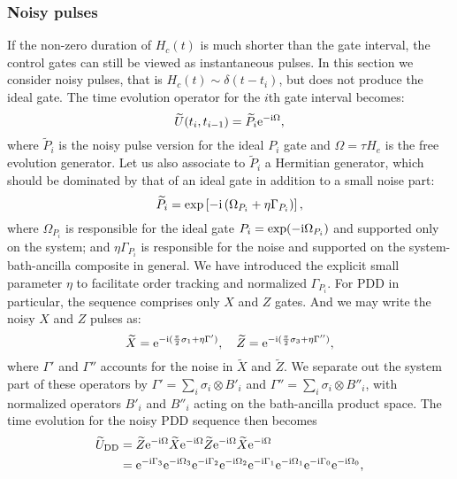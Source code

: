 \documentclass[pra,reprint,superscriptaddress]{revtex4-2}
\newcommand{\wtP}{\widetilde{P}}
\newcommand{\wtU}{\widetilde{U}}
\newcommand{\wt}[1]{\widetilde{#1}}
\newcommand{\rDD}{\mathrm{DD}}
\begin{document}
\subsubsection{Noisy pulses}
If the non-zero duration of $H_c(t)$ is much shorter than the gate interval,  the control gates can still be viewed as instantaneous pulses. In this section we consider noisy pulses, that is 
$H_c(t)\sim \delta(t-t_i)$, but does not produce the ideal gate.
The  time evolution operator for the $i$th gate interval becomes:
\begin{equation}\label{eq:npulses-Ui}
 \wtU(t_i,t_{i-1}) = \wtP_i \upe^{-\upi \Omega},
\end{equation}
where $\widetilde{P}_i$ is the noisy pulse version for the ideal $P_i$ gate and $\Omega=\tau H_e$ is the free evolution generator.
Let us also associate to $\wtP_i$ a Hermitian generator, which should be dominated by that of an ideal gate in addition to a small noise part:
\begin{equation}\label{eq:npulses-Pi}
 \widetilde{P}_i= \exp\left[ -\mathrm{i} \left( \Omega_{P_i} +  \eta \Gamma_{P_i} \right)  \right],
\end{equation}
where $\Omega_{P_i}$ is responsible for the ideal gate $P_i = \exp(-\mathrm{i} \Omega_{P_i})$ and supported only on the system; and $ \eta \Gamma_{P_i} $ is responsible for the noise and supported on the system-bath-ancilla composite in general. We have introduced the explicit small parameter $\eta$ to facilitate order tracking and normalized $\Gamma_{P_i}$. For PDD in particular, the sequence comprises only $X$ and $Z$ gates. 
And we may write the noisy $X$ and $Z$ pulses as:
\begin{equation}
\widetilde{X} = \mathrm{e}^{-\mathrm{i} ( \frac{\pi}{2} \sigma_1 + \eta\Gamma')},\quad
 \widetilde{Z} = \mathrm{e}^{-\mathrm{i} ( \frac{\pi}{2} \sigma_3 + \eta\Gamma'')},
\end{equation}
where $\Gamma'$ and $\Gamma''$ accounts for the noise in $\wt X$ and $\wt Z$.
We separate out the system part of these operators by $\Gamma' = \sum_i \sigma_i \otimes B'_i $ and $\Gamma''=\sum_i \sigma_i \otimes B''_i$, with normalized operators $B'_i$ and $B''_i$ acting on the bath-ancilla product space. 
The time evolution for the noisy PDD sequence then becomes
\begin{equation}\label{eq:UPDD-gatedep}
 \begin{aligned}
\wtU_\rDD &=
 \widetilde{Z} \upe^{-\upi \Omega}
 \widetilde{X} \upe^{-\upi \Omega}
 \widetilde{Z} \upe^{-\upi \Omega}
 \widetilde{X} \upe^{-\upi \Omega}\\
 & = \upe^{-\upi  \Gamma_3} \upe^{- \upi\Omega_3}
 \upe^{-\upi  \Gamma_2}  \upe^{-\upi\Omega_2}
\upe^{-\upi  \Gamma_1} \upe^{-\upi\Omega_1}
\upe^{-\upi  \Gamma_0}  \upe^{-\upi \Omega_0},
\end{aligned}
\end{equation}
\end{document}
